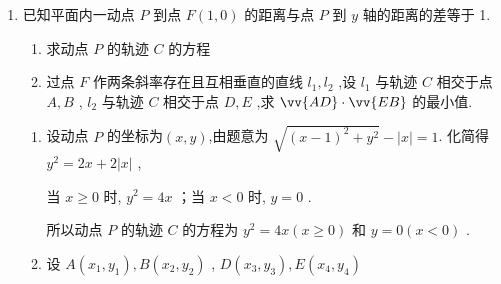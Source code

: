 \begin{enumerate}
\begin{jieda}
\begin{enumerate}
             由已知, ${F}_{1}\left( {-2,0}\right) ,{F}_{2}\left( {2,0}\right)$ .设$P(x_0, y_0)$为双曲线上一点，则$|F_1P| = \sqrt{(x_0+2)^2+y_0^2} = |1+2x_0|$

             若$A, B$位于同一支，则必有横坐标相同，与$l$ 的斜率存在矛盾，故不妨设$A$在左支，$B$在右支，故有$-(1+2x_A) = 1+2x_B$，因此$x_A+x_B = -1$.
            
            设 $A\left( {{x}_{1},{y}_{1}}\right) ,B\left( {{x}_{2},{y}_{2}}\right)$ ,直线 $l : y = k\left( {x - 2}\right)$ . 显然 $k \neq  0$ .
            
            由 $\left\{  \begin{array}{l} {x}^{2} - \dfrac{{y}^{2}}{3} = 1 \\  y = k\left( {x - 2}\right)  \end{array}\right.$ ,得 $\left( {{k}^{2} - 3}\right) {x}^{2} - 4{k}^{2}x + 4{k}^{2} + 3 = 0$ .因为 $l$ 与双曲线交于两点,所以 ${k}^{2} - 3 \neq  0$ ,且 $\Delta  = {36}\left( {1 + {k}^{2}}\right)  > 0$.

            根据韦达定理有$x_A+x_B = \dfrac{4k^2}{k^2-3} = -1$，故$k = \pm \dfrac{\sqrt{15}}{5}$
        \end{enumerate}
    \end{jieda}
    
    \item 已知平面内一动点 $P$ 到点 ${F}\left( {1,0}\right)$ 的距离与点 $P$ 到 $y$ 轴的距离的差等于 1.
    \begin{enumerate}
        \item 求动点 $P$ 的轨迹 $C$ 的方程
        \item 过点 $F$ 作两条斜率存在且互相垂直的直线 ${l}_{1},{l}_{2}$ ,设 ${l}_{1}$ 与轨迹 $C$ 相交于点 $A,B$ , ${l}_{2}$ 与轨迹 $C$ 相交于点 $D,E$ ,求 $\vv{AD} \cdot  \vv{EB}$ 的最小值.
    \end{enumerate}
    \begin{jieda}
        \begin{enumerate}
            \item 设动点 $P$ 的坐标为$(x, y)$,由题意为 $\sqrt{{\left( x - 1\right) }^{2} + {y}^{2}} - \left| x\right|  = 1$. 化简得 ${y}^{2} = {2x} + 2\left| x\right|$ ,
            
            当 $x \geq  0$ 时, ${y}^{2} = {4x}$ ；当 $x < 0$ 时, $y = 0$ .
            
            所以动点 ${P}$ 的轨迹 ${C}$ 的方程为 ${y}^{2} = {4x}\left( {x \geq  0}\right)$ 和 $y = 0\left( {x < 0}\right)$ .
            
            \item 
            设 $A\left( {{x}_{1},{y}_{1}}\right) ,B\left( {{x}_{2},{y}_{2}}\right)$ , $D\left( {{x}_{3},{y}_{3}}\right), E\left( {{x}_{4},{y}_{4}}\right)$


\end{enumerate}
\end{jieda}
\end{enumerate}
